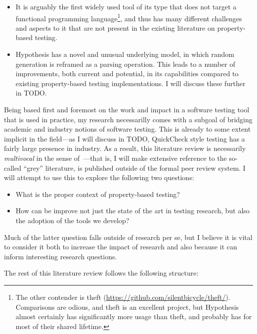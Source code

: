 \begin{itemize}
\item It is arguably the first widely used tool of its type that does not target a functional programming language\footnote{
The other contender is theft (\url{https://github.com/silentbicycle/theft/}).
Comparisons are odious,
and theft is an excellent project,
but Hypothesis almost certainly has significantly more usage than theft,
and probably has for most of their shared lifetime.
},
and thus has many different challenges and aspects to it that are not present in the existing literature on property-based testing.
\item Hypothesis has a novel and unusual underlying model,
in which random generation is reframed as a parsing operation.
This leads to a number of improvements,
both current and potential,
in its capabilities compared to existing property-based testing implementations.
I will discuss these further in TODO.\ 
\end{itemize}

Being based first and foremost on the work and impact in a software testing tool that is used in practice,
my research necessarilly comes with a subgoal of bridging academic and industry notions of software testing.
This is already to some extent implicit in the field---as
I will discuss in TODO,
QuickCheck style testing has a fairly large presence in industry.
As a result,
this literature review is necessarily \emph{multivocal} in the sense of~\cite{DBLP:conf/ease/GarousiFM16}---that is,
I will make extensive reference to the so-called ``grey'' literature,
is published outside of the formal peer review system.
I will attempt to use this to explore the following two questions:

\begin{itemize}
\item What is the proper context of property-based testing?
\item How can be improve not just the state of the art in testing research,
but also the adoption of the tools we develop?
\end{itemize}

Much of the latter question falls outside of research per se,
but I believe it is vital to consider it both to increase the impact of research and also because it can inform interesting research questions.

The rest of this literature review follows the following structure:

